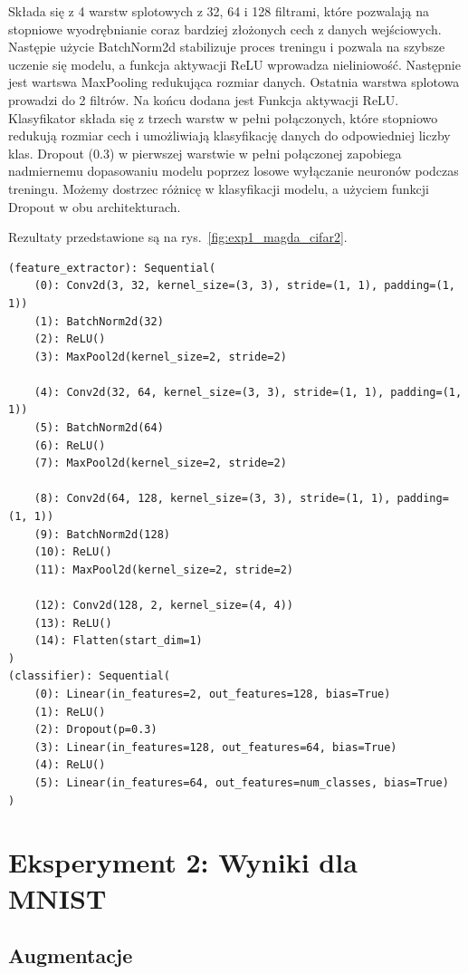 \documentclass[10pt]{article}
\begin{document}
Składa się z 4 warstw splotowych z 32, 64 i 128 filtrami, które pozwalają na stopniowe wyodrębnianie coraz bardziej złożonych cech z danych wejściowych.
Następie użycie BatchNorm2d stabilizuje proces treningu i pozwala na szybsze uczenie się modelu, a funkcja aktywacji ReLU wprowadza nieliniowość.
Następnie jest wartswa MaxPooling redukująca rozmiar danych.
Ostatnia warstwa splotowa prowadzi do 2 filtrów.
Na końcu dodana jest Funkcja aktywacji ReLU\@.
Klasyfikator składa się z trzech warstw w pełni połączonych, które stopniowo redukują rozmiar cech i umożliwiają klasyfikację danych do odpowiedniej liczby klas.
Dropout (0.3) w pierwszej warstwie w pełni połączonej zapobiega nadmiernemu dopasowaniu modelu poprzez losowe wyłączanie neuronów podczas treningu.
Możemy dostrzec różnicę w klasyfikacji modelu, a użyciem funkcji Dropout w obu architekturach.

Rezultaty przedstawione są na rys.~\ref{fig:exp1_magda_cifar2}.

\tiny
\begin{verbatim}
(feature_extractor): Sequential(
    (0): Conv2d(3, 32, kernel_size=(3, 3), stride=(1, 1), padding=(1, 1))
    (1): BatchNorm2d(32)
    (2): ReLU()
    (3): MaxPool2d(kernel_size=2, stride=2)

    (4): Conv2d(32, 64, kernel_size=(3, 3), stride=(1, 1), padding=(1, 1))
    (5): BatchNorm2d(64)
    (6): ReLU()
    (7): MaxPool2d(kernel_size=2, stride=2)

    (8): Conv2d(64, 128, kernel_size=(3, 3), stride=(1, 1), padding=(1, 1))
    (9): BatchNorm2d(128)
    (10): ReLU()
    (11): MaxPool2d(kernel_size=2, stride=2)

    (12): Conv2d(128, 2, kernel_size=(4, 4))
    (13): ReLU()
    (14): Flatten(start_dim=1)
)
(classifier): Sequential(
    (0): Linear(in_features=2, out_features=128, bias=True)
    (1): ReLU()
    (2): Dropout(p=0.3)
    (3): Linear(in_features=128, out_features=64, bias=True)
    (4): ReLU()
    (5): Linear(in_features=64, out_features=num_classes, bias=True)
)
\end{verbatim}
\normalsize



\pagebreak
\section{Eksperyment 2: Wyniki dla MNIST}\label{sec:ex2_mnist}

\subsection*{Augmentacje}
\end{document}

